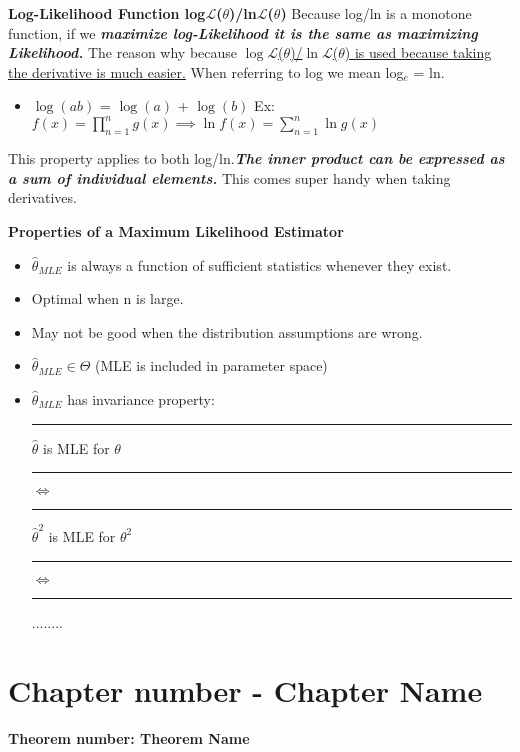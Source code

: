 \documentclass[]{article}
\begin{document}
\Large\textbf{Log-Likelihood Function log$\mathcal{L}$($\theta$)/ln$\mathcal{L}$($\theta$)}
\newline Because log/ln is a monotone function, if we \textbf{\textit{maximize log-Likelihood it is the same as maximizing Likelihood.} } The reason why  because \ul{$\log\mathcal{L}$($\theta$)/$\ln\mathcal{L}$($\theta$) is used because taking the derivative is much easier.} When referring to log we mean log$_e$ = ln.
\begin{itemize}
	\item $\log(ab)$ = $\log(a)$ + $\log(b)$
	\newline Ex: $f(x) = \displaystyle\prod_{n=1}^{n}g(x) \implies \ln{f(x)} =  \sum_{n=1}^{n} \ln g(x)$ 
\end{itemize}
This property applies to both log/ln.\textbf{\textit{The inner product can be expressed as a sum of individual elements.}} This comes super handy when taking derivatives.

\newpage
\Large\textbf{Properties of a Maximum Likelihood Estimator}
\begin{itemize}
	\item $\hat\theta_{MLE}$ is always a function of sufficient statistics whenever they exist.
	\item Optimal when n is large.
	\item May not be good when the distribution assumptions are wrong.
	\item $\hat\theta_{MLE} \in \Theta$ (MLE is included in parameter space)
	\item $\hat\theta_{MLE}$ has invariance property:
	\newline\Large\rule{7cm}{0pt} $\hat\theta$ is MLE for $\theta$ 
	\newline\Large\rule{8cm}{0pt} $\iff$ 
	\newline\Large\rule{7cm}{0pt} $\hat\theta^2$ is MLE for $\theta^2$ 
	\newline\Large\rule{8cm}{0pt} $\iff$ 
	\newline\Large\rule{8cm}{0pt} ........
\end{itemize}

\newpage
\section{Chapter number - Chapter Name}
\Large\textbf{Theorem number: Theorem Name}
\end{document}
